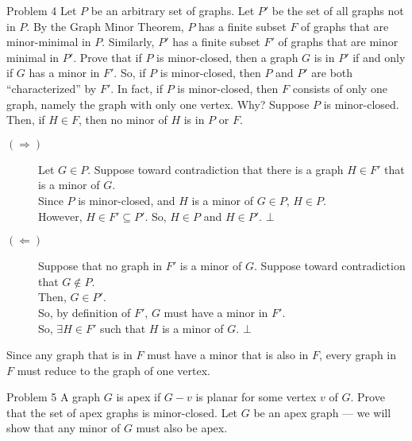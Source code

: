 \documentclass[8pt]{extarticle}
\begin{document}
  \begin{problem}{Problem 4}
    Let $P$ be an arbitrary set of graphs. Let $P'$ be the set of all graphs not in $P$. By the Graph Minor Theorem, $P$ has a finite subset $F$ of graphs that are minor-minimal in $P$. Similarly, $P'$ has a finite subset $F'$ of graphs that are minor minimal in $P'$. Prove that if $P$ is minor-closed, then a graph $G$ is in $P'$ if and only if $G$ has a minor in $F'$. So, if $P$ is minor-closed, then $P$ and $P'$ are both ``characterized'' by $F'$. In fact, if $P$ is minor-closed, then $F$ consists of only one graph, namely the graph with only one vertex. Why?
    \tcblower
    Suppose $P$ is minor-closed. Then, if $H\in F$, then no minor of $H$ is in $P$ or $F$. 
    \begin{description}
      \item[$(\Rightarrow)$] Let $G\in P$. Suppose toward contradiction that there is a graph $H\in F'$ that is a minor of $G$.\\

        Since $P$ is minor-closed, and $H$ is a minor of $G\in P$, $H\in P$.\\

        However, $H\in F'\subseteq P'$. So, $H\in P$ and $H\in P'$. $\bot$
      \item[$(\Leftarrow)$] Suppose that no graph in $F'$ is a minor of $G$. Suppose toward contradiction that $G \notin P$.\\

        Then, $G\in P'$.\\

        So, by definition of $F'$, $G$ must have a minor in $F'$.\\

        So, $\exists H\in F'$ such that $H$ is a minor of $G$. $\bot$
    \end{description}
    Since any graph that is in $F$ must have a minor that is also in $F$, every graph in $F$ must reduce to the graph of one vertex.
  \end{problem}
  \begin{problem}{Problem 5}
    A graph $G$ is apex if $G-v$ is planar for some vertex $v$ of $G$. Prove that the set of apex graphs is minor-closed.
    \tcblower
    Let $G$ be an apex graph --- we will show that any minor of $G$ must also be apex.
  \end{problem}
\end{document}
